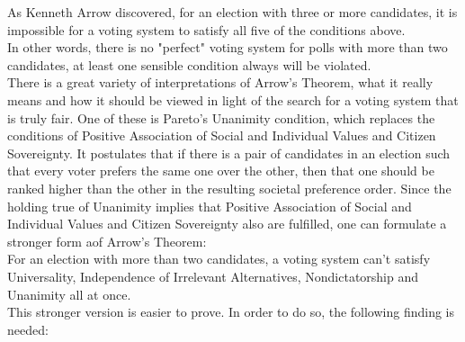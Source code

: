 As Kenneth Arrow discovered, for an election with three or more candidates, it is impossible for a voting system to satisfy all five of the conditions above.  \\
In other words, there is no "perfect" voting system for polls with more than two candidates, at least one sensible condition always will be violated. \\ There is a great variety of interpretations of Arrow's Theorem, what it really means and how it should be viewed in light of the search for a voting system that is truly fair. 
One of these is Pareto's Unanimity condition, which replaces the conditions of Positive Association of Social and Individual Values and Citizen Sovereignty. It postulates that if there is a pair of candidates in an election such that every voter prefers the same one over the other, then that one should be ranked higher than the other in the resulting societal preference order. 
Since the holding true of Unanimity implies that Positive Association of Social and Individual Values and Citizen Sovereignty also are fulfilled, one can formulate a stronger form aof Arrow's Theorem: \\
For an election with more than two candidates, a voting system can't satisfy Universality, Independence of Irrelevant Alternatives, Nondictatorship and Unanimity all at once. \\

This stronger version is easier to prove. In order to do so, the following finding is needed: \\

